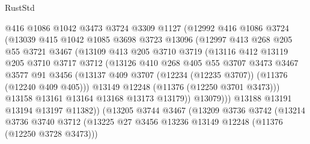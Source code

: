 \begin{lexlean}{RustStd}
\begin{coremodule}
{{{{{{{{{{{{{{{{{{{                    @416
                    @1086
                    @1042
                    @3473
                    @3724
                    @3309
                    @1127
                    (@12992
                      @416
                      @1086
                      @3724
                      (@13039
                        @415
                        @1042
                        @1085
                        @3698
                        @3723
                        @13096
                        (@12997
                          @413
                          @268
                          @205
                          @55
                          @3721
                          @3467
                          (@13109
                            @413
                            @205
                            @3710
                            @3719
                            (@13116
                              @412
                              @13119
                              @205
                              @3710
                              @3717
                              @3712
                              (@13126
                                @410
                                @268
                                @405
                                @55
                                @3707
                                @3473
                                @3467
                                @3577
                                @91
                                @3456
                                (@13137
                                  @409
                                  @3707
                                  (@12234 (@12235 @3707))
                                  (@11376 (@12240 @409 @405)))
                                @13149
                                @12248
                                (@11376 (@12250 @3701 @3473)))
                              @13158
                              @13161
                              @13164
                              @13168
                              @13173
                              @13179))
                          @13079)))
                    @13188
                    @13191
                    @13194
                    @13197
                    @11382))
                (@13205
                  @3744
                  @3467
                  (@13209
                    @3736
                    @3742
                    (@13214
                      @3736
                      @3740
                      @3712
                      (@13225 @27 @3456 @13236 @13149 @12248 (@11376 (@12250 @3728 @3473)))
}}}}}}}}}}}}}}}}}}}
\end{coremodule}
\end{lexlean}
